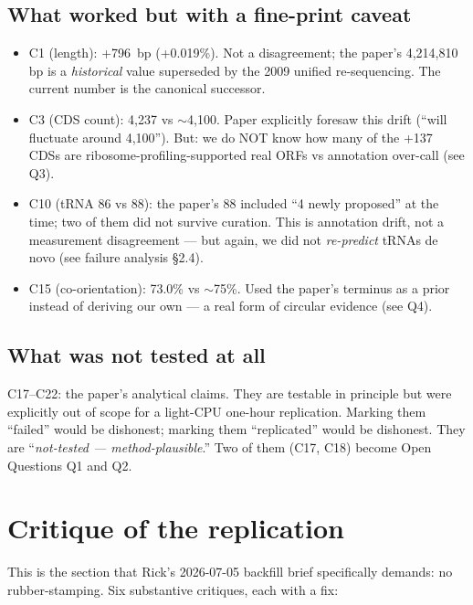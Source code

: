 \documentclass[11pt,letterpaper]{article}
\begin{document}
\subsection*{What worked but with a fine-print caveat}
\begin{itemize}[nosep]
\item C1 (length): +796~bp (+0.019\%). Not a disagreement; the paper's 4,214,810 bp is a \emph{historical} value superseded by the 2009 unified re-sequencing. The current number is the canonical successor.
\item C3 (CDS count): 4,237 vs $\sim$4,100. Paper explicitly foresaw this drift (``will fluctuate around 4,100''). But: we do NOT know how many of the +137 CDSs are ribosome-profiling-supported real ORFs vs annotation over-call (see Q3).
\item C10 (tRNA 86 vs 88): the paper's 88 included ``4 newly proposed'' at the time; two of them did not survive curation. This is annotation drift, not a measurement disagreement --- but again, we did not \emph{re-predict} tRNAs de novo (see failure analysis \S2.4).
\item C15 (co-orientation): 73.0\% vs $\sim$75\%. Used the paper's terminus as a prior instead of deriving our own --- a real form of circular evidence (see Q4).
\end{itemize}

\subsection*{What was not tested at all}
C17--C22: the paper's analytical claims. They are testable in principle but were explicitly out of scope for a light-CPU one-hour replication. Marking them ``failed'' would be dishonest; marking them ``replicated'' would be dishonest. They are ``\emph{not-tested --- method-plausible}.'' Two of them (C17, C18) become Open Questions Q1 and Q2.

\section{Critique of the replication}
\label{sec:critique-repl}

This is the section that Rick's 2026-07-05 backfill brief specifically demands: no rubber-stamping. Six substantive critiques, each with a fix:
\end{document}

